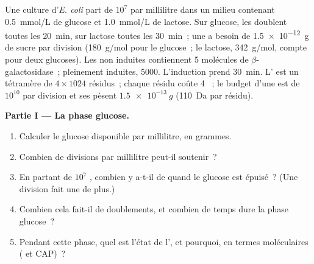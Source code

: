 \begin{problem}
\label{pb:b1:expression-control:1}
Une culture d'\emph{E. coli} part de $10^7$  par millilitre dans
un milieu contenant \qty{0.5}{mmol/L} de glucose et \qty{1.0}{mmol/L} de
lactose. Sur glucose, les  doublent toutes les \qty{20}{min},
sur lactose toutes les \qty{30}{min}~; une  a besoin de
\qty{1.5e-12}{g} de sucre par division (\qty{180}{g/mol} pour le
glucose~; le lactose, \qty{342}{g/mol}, compte pour deux glucoses). Les
 non induites contiennent 5 molécules de
$\beta$-galactosidase~; pleinement induites, \num{5000}. L'induction
prend \qty{30}{min}. L' est un tétramère de $4\times 1024$
résidus~; chaque résidu coûte 4 ~; le budget  d'une  est de
$10^{10}$ par division et ses  pèsent $\qty{1.5e-13}{g}$
(\qty{110}{Da} par résidu).

\medskip
\noindent\textbf{Partie I --- La phase glucose.}
\begin{enumerate}
  \item Calculer le glucose disponible par millilitre, en grammes.
  \item Combien de divisions par millilitre peut-il soutenir~?
  \item En partant de $10^7$ , combien y a-t-il de 
        quand le glucose est épuisé~? (Une division fait une  de
        plus.)
  \item Combien cela fait-il de doublements, et combien de temps dure la
        phase glucose~?
  \item Pendant cette phase, quel est l'état de l', et
        pourquoi, en termes moléculaires ( et CAP)~?
\end{enumerate}


\end{problem}
